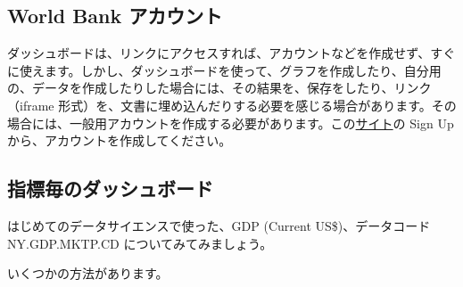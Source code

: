\documentclass[
  xelatex, ja=standard]{bxjsbook}
\theoremstyle{definition}
\theoremstyle{definition}
\theoremstyle{definition}
\theoremstyle{definition}
\theoremstyle{remark}
\begin{document}
\hypertarget{world-bank-ux30a2ux30abux30a6ux30f3ux30c8}{%
\subsection{World Bank アカウント}\label{world-bank-ux30a2ux30abux30a6ux30f3ux30c8}}

ダッシュボードは、リンクにアクセスすれば、アカウントなどを作成せず、すぐに使えます。しかし、ダッシュボードを使って、グラフを作成したり、自分用の、データを作成したりした場合には、その結果を、保存をしたり、リンク（iframe 形式）を、文書に埋め込んだりする必要を感じる場合があります。その場合には、一般用アカウントを作成する必要があります。この\href{https://login.worldbankgroup.org/worldbankgroupb2c.onmicrosoft.com/b2c_1_wbg-solexternal_sisu/oauth2/v2.0/authorize?client_id=7077d845-b099-4fca-9f1b-8fcaade1524c\&scope=openid\%20profile\%20offline_access\&redirect_uri=https\%3A\%2F\%2Fpip.worldbank.org\%2Fsol\%2F\&client-request-id=a3010f0e-81e7-45c4-b519-d8e044d3a89b\&response_mode=fragment\&response_type=code\&x-client-SKU=msal.js.browser\&x-client-VER=2.34.0\&client_info=1\&code_challenge=Ome3V78SVvRRXZvJ3DjMvKDuE5CE-N59RHOY09WJ_LY\&code_challenge_method=S256\&nonce=0a59c36f-97dd-4369-a233-544b6a6393eb\&state=eyJpZCI6Ijc3M2MxM2MzLTg5OTItNDEwMS05MmJkLWYyZThmZDQwNjdlZiIsIm1ldGEiOnsiaW50ZXJhY3Rpb25UeXBlIjoicmVkaXJlY3QifX0\%3D}{サイト}の Sign Up から、アカウントを作成してください。

\hypertarget{ux6307ux6a19ux6bceux306eux30c0ux30c3ux30b7ux30e5ux30dcux30fcux30c9}{%
\subsection{指標毎のダッシュボード}\label{ux6307ux6a19ux6bceux306eux30c0ux30c3ux30b7ux30e5ux30dcux30fcux30c9}}

はじめてのデータサイエンスで使った、GDP (Current US\$)、データコード NY.GDP.MKTP.CD についてみてみましょう。

いくつかの方法があります。
\end{document}
